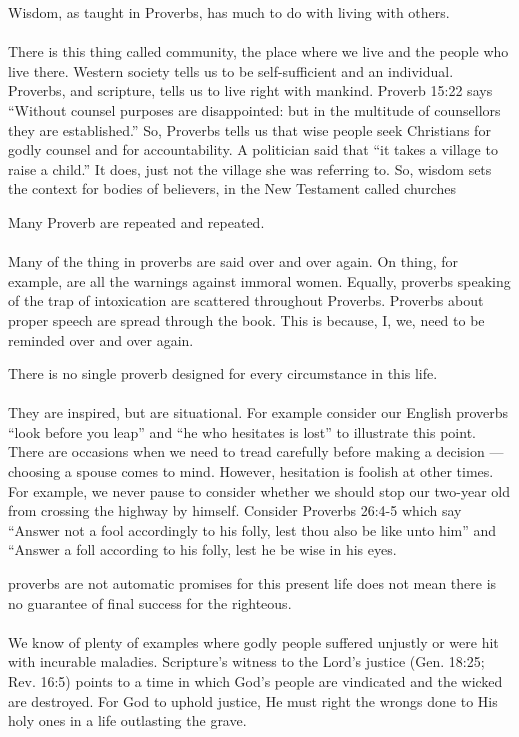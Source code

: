 \begin{compactenum}
    \item Wisdom, as taught in Proverbs, has much to do with living with others.\\
    \\
    There is this thing called community, the place where we live and the people who live there. Western society tells us to be self-sufficient and an individual.  Proverbs, and scripture, tells us to live right with mankind. Proverb 15:22 says ``Without counsel purposes are disappointed: but in the multitude of counsellors they are established.'' So, Proverbs tells us that wise people seek Christians for godly counsel and for accountability. A politician said that ``it takes a village to raise a child.'' It does, just not the village she was referring to. So, wisdom sets the context for bodies of believers, in the New Testament called churches\\
    \item Many Proverb are repeated and repeated.\\
    \\
    Many of the thing in proverbs are said over and over again. On thing, for example, are all  the warnings against immoral women.  Equally, proverbs speaking of the trap of intoxication are scattered throughout Proverbs. Proverbs about proper speech are spread through the book. This is because, I, we, need to be reminded over and over again.\\
    \item There is no single proverb  designed for every circumstance in this life.\\
    \\
    They are inspired, but are situational. For example consider our English proverbs “look before you leap” and “he who hesitates is lost” to illustrate this point. There are occasions when we need to tread carefully before making a decision — choosing a spouse comes to mind. However, hesitation is foolish at other times. For example, we never pause to consider whether we should stop our two-year old from crossing the highway by himself. Consider Proverbs 26:4-5 which say ``Answer not  a fool accordingly to his folly, lest thou also be like unto him'' and ``Answer a foll according to his folly, lest he be wise in his eyes.
    \item proverbs are not automatic promises for this present life does not mean there is no guarantee of final success for the righteous.\\
    \\
    We know of plenty of examples where godly people suffered unjustly or were hit with incurable maladies. Scripture’s witness to the Lord’s justice (Gen. 18:25; Rev. 16:5) points to a time in which God’s people are vindicated and the wicked are destroyed. For God to uphold justice, He must right the wrongs done to His holy ones in a life outlasting the grave.

\end{compactenum}
